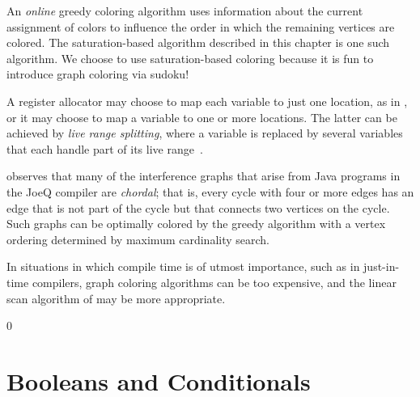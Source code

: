 \documentclass[7x10]{TimesAPriori_MIT}%
\def\racketEd{0}
\def\edition{1}
\numberwithin{theorem}{chapter}
\numberwithin{definition}{chapter}
\numberwithin{equation}{chapter}
\begin{document}
An \emph{online} greedy coloring algorithm uses information about the
current assignment of colors to influence the order in which the
remaining vertices are colored. The saturation-based algorithm
described in this chapter is one such algorithm. We choose to use
saturation-based coloring because it is fun to introduce graph
coloring via sudoku!

A register allocator may choose to map each variable to just one
location, as in \citet{Chaitin:1981vl}, or it may choose to map a
variable to one or more locations. The latter can be achieved by
\emph{live range splitting}, where a variable is replaced by several
variables that each handle part of its live
range~\citep{Chow:1984ys,Briggs:1994kx,Cooper:1998ly}.






\citet{Palsberg:2007si} observes that many of the interference graphs
that arise from Java programs in the JoeQ compiler are \emph{chordal};
that is, every cycle with four or more edges has an edge that is not
part of the cycle but that connects two vertices on the cycle. Such
graphs can be optimally colored by the greedy algorithm with a vertex
ordering determined by maximum cardinality search.

In situations in which compile time is of utmost importance, such as
in just-in-time compilers, graph coloring algorithms can be too
expensive, and the linear scan algorithm of \citet{Poletto:1999uq} may
be more appropriate.


{\if\edition\racketEd
{}
\fi}
\chapter{Booleans and Conditionals}
\label{ch:Lif}
\setcounter{footnote}{0}
\end{document}
